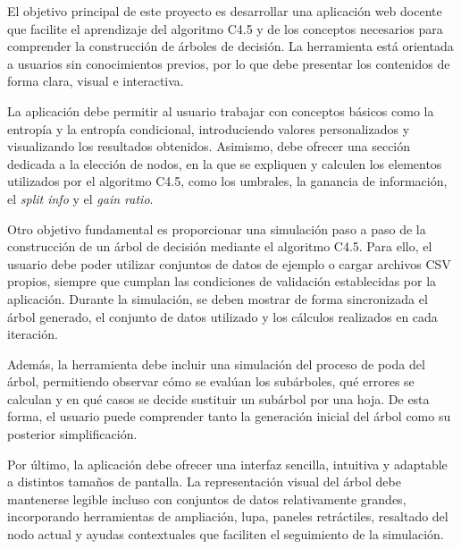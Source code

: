 
El objetivo principal de este proyecto es desarrollar una aplicación web docente que facilite el aprendizaje del algoritmo C4.5 y de los conceptos necesarios para comprender la construcción de árboles de decisión. La herramienta está orientada a usuarios sin conocimientos previos, por lo que debe presentar los contenidos de forma clara, visual e interactiva.

La aplicación debe permitir al usuario trabajar con conceptos básicos como la entropía y la entropía condicional, introduciendo valores personalizados y visualizando los resultados obtenidos. Asimismo, debe ofrecer una sección dedicada a la elección de nodos, en la que se expliquen y calculen los elementos utilizados por el algoritmo C4.5, como los umbrales, la ganancia de información, el \textit{split info} y el \textit{gain ratio}.

Otro objetivo fundamental es proporcionar una simulación paso a paso de la construcción de un árbol de decisión mediante el algoritmo C4.5. Para ello, el usuario debe poder utilizar conjuntos de datos de ejemplo o cargar archivos CSV propios, siempre que cumplan las condiciones de validación establecidas por la aplicación. Durante la simulación, se deben mostrar de forma sincronizada el árbol generado, el conjunto de datos utilizado y los cálculos realizados en cada iteración.

Además, la herramienta debe incluir una simulación del proceso de poda del árbol, permitiendo observar cómo se evalúan los subárboles, qué errores se calculan y en qué casos se decide sustituir un subárbol por una hoja. De esta forma, el usuario puede comprender tanto la generación inicial del árbol como su posterior simplificación.

Por último, la aplicación debe ofrecer una interfaz sencilla, intuitiva y adaptable a distintos tamaños de pantalla. La representación visual del árbol debe mantenerse legible incluso con conjuntos de datos relativamente grandes, incorporando herramientas de ampliación, lupa, paneles retráctiles, resaltado del nodo actual y ayudas contextuales que faciliten el seguimiento de la simulación.

